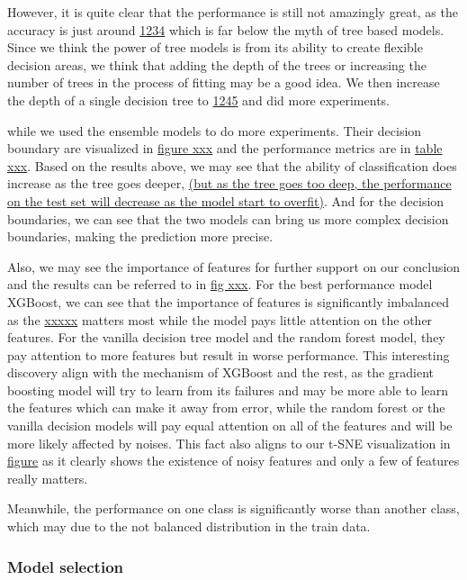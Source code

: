 \documentclass{article}
\begin{document}
However, it is quite clear that the performance is still not amazingly great, as the accuracy is just around \underline{1234} which is far below the myth of tree based models. Since we think the power of tree models is from its ability to create flexible decision areas, we think that adding the depth of the trees or increasing the number of trees in the process of fitting may be a good idea. We then increase the depth of a single decision tree to \underline{1245} and did more experiments.



while we used the ensemble models to do more experiments. Their decision boundary are visualized in \underline{figure xxx} and the performance metrics are in \underline{table xxx}. Based on the results above, we may see that the ability of classification does increase as the tree goes deeper, 
\underline{(but as the tree goes too deep, the performance on the test set will decrease as the model start to overfit)}. 
And for the decision boundaries, we can see that the two models can bring us more complex decision boundaries, making the prediction more precise. 



Also, we may see the importance of features for further support on our conclusion and the results can be referred to in \underline{fig xxx}. For the best performance model XGBoost, we can see that the importance of features is significantly imbalanced as the \underline{xxxxx} matters most while the model pays little attention on the other features. For the vanilla decision tree model and the random forest model, they pay attention to more features but result in worse performance. This interesting discovery align with the mechanism of XGBoost and the rest, as the gradient boosting model will try to learn from its failures and may be more able to learn the features which can make it away from error, while the random forest or the vanilla decision models will pay equal attention on all of the features and will be more likely affected by noises. This fact also aligns to our t-SNE visualization in \underline{figure} as it clearly shows the existence of noisy features and
only a few of features really matters.

Meanwhile, the performance on one class is significantly worse than another class, which may due to the not balanced distribution in the train data.

\subsubsection*{Model selection}
\end{document}
